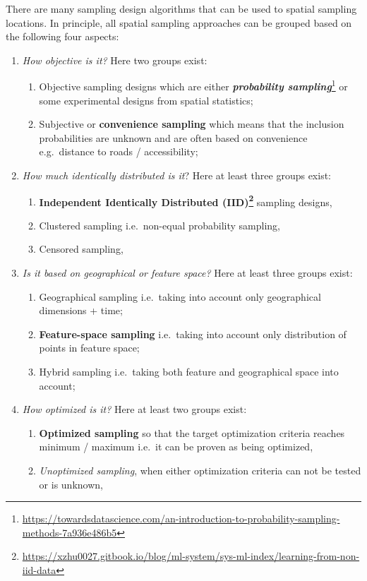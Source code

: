\documentclass[
  graybox,natbib,nospthms]{svmono}
\renewcommand{\href}[2]{#2 (\url{#1})}
\renewcommand{\href}[2]{#2\footnote{\url{#1}}}
\begin{document}
There are many sampling design algorithms that can be used to spatial
sampling locations. In principle, all spatial sampling approaches can be
grouped based on the following four aspects:

\begin{enumerate}
\def\labelenumi{\arabic{enumi}.}
\item
  \emph{How objective is it?} Here two groups exist:

  \begin{enumerate}
  \def\labelenumii{\alph{enumii}.}
  \item
    Objective sampling designs which are either \href{https://towardsdatascience.com/an-introduction-to-probability-sampling-methods-7a936e486b5}{\textbf{\emph{probability
    sampling}}}
    or some experimental designs from spatial statistics;
  \item
    Subjective or \textbf{convenience sampling} which means that the
    inclusion probabilities are unknown and are often based on
    convenience e.g.~distance to roads / accessibility;
  \end{enumerate}
\item
  \emph{How much identically distributed is it}? Here at least three groups
  exist:

  \begin{enumerate}
  \def\labelenumii{\alph{enumii}.}
  \item
    \textbf{\href{https://xzhu0027.gitbook.io/blog/ml-system/sys-ml-index/learning-from-non-iid-data}{Independent Identically Distributed (IID)}}
    sampling designs,
  \item
    Clustered sampling i.e.~non-equal probability sampling,
  \item
    Censored sampling,
  \end{enumerate}
\item
  \emph{Is it based on geographical or feature space?} Here at least three
  groups exist:

  \begin{enumerate}
  \def\labelenumii{\alph{enumii}.}
  \item
    Geographical sampling i.e.~taking into account only geographical dimensions + time;
  \item
    \textbf{Feature-space sampling} i.e.~taking into account only distribution of points in feature space;
  \item
    Hybrid sampling i.e.~taking both feature and geographical space into account;
  \end{enumerate}
\item
  \emph{How optimized is it?} Here at least two groups exist:

  \begin{enumerate}
  \def\labelenumii{\alph{enumii}.}
  \item
    \textbf{Optimized sampling} so that the target optimization criteria
    reaches minimum / maximum i.e.~it can be proven as being optimized,
  \item
    \emph{Unoptimized sampling}, when either optimization criteria can not be tested or is unknown,
  \end{enumerate}
\end{enumerate}
\end{document}
